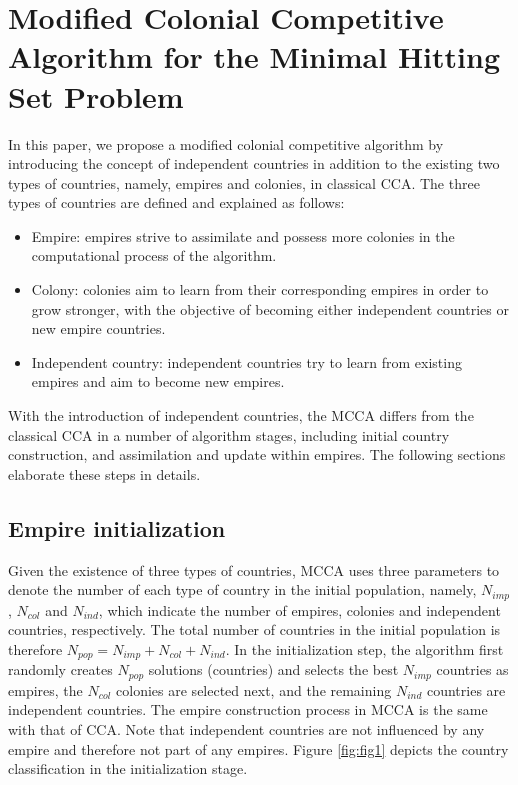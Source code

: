 \section{Modified Colonial Competitive Algorithm for the Minimal Hitting Set Problem}
In this paper, we propose a modified colonial competitive algorithm by introducing the concept of independent countries in addition to the existing two types of countries, namely, empires and colonies, in classical CCA.
The three types of countries are defined and explained as follows:
\begin{itemize}
	\item Empire: empires strive to assimilate and possess more colonies in the computational process of the algorithm.
	\item Colony: colonies aim to learn from their corresponding empires in order to grow stronger, with the objective of becoming either independent countries or new empire countries.
	\item Independent country: independent countries try to learn from existing empires and aim to become new empires.
\end{itemize}

With the introduction of independent countries, the MCCA differs from the classical CCA in a number of algorithm stages, including initial country construction, and assimilation and update within empires.
The following sections elaborate these steps in details.


\subsection{Empire initialization}
Given the existence of three types of countries, MCCA uses three parameters to denote the number of each type of country in the initial population, namely, $N_{imp}$, $N_{col}$ and $N_{ind}$, which indicate the number of empires, colonies and independent countries, respectively.
The total number of countries in the initial population is therefore $N_{pop} = N_{imp} + N_{col} + N_{ind}$.
In the initialization step, the algorithm first randomly creates $N_{pop}$ solutions (countries) and selects the best $N_{imp}$ countries as empires, the $N_{col}$ colonies are selected next, and the remaining $N_{ind}$ countries are independent countries. 
The empire construction process in MCCA is the same with that of CCA.
Note that independent countries are not influenced by any empire and therefore not part of any empires.
Figure \ref{fig:fig1} depicts the country classification in the initialization stage.


